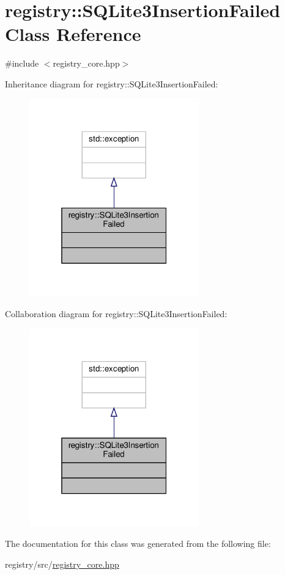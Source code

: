 \hypertarget{classregistry_1_1SQLite3InsertionFailed}{}\section{registry\+:\+:S\+Q\+Lite3\+Insertion\+Failed Class Reference}
\label{classregistry_1_1SQLite3InsertionFailed}


{\ttfamily \#include $<$registry\+\_\+core.\+hpp$>$}



Inheritance diagram for registry\+:\+:S\+Q\+Lite3\+Insertion\+Failed\+:
\nopagebreak
\begin{figure}[H]
\begin{center}
\leavevmode
\includegraphics[width=208pt]{classregistry_1_1SQLite3InsertionFailed__inherit__graph}
\end{center}
\end{figure}


Collaboration diagram for registry\+:\+:S\+Q\+Lite3\+Insertion\+Failed\+:
\nopagebreak
\begin{figure}[H]
\begin{center}
\leavevmode
\includegraphics[width=208pt]{classregistry_1_1SQLite3InsertionFailed__coll__graph}
\end{center}
\end{figure}


The documentation for this class was generated from the following file\+:\begin{DoxyCompactItemize}
\item 
registry/src/\hyperlink{registry__core_8hpp}{registry\+\_\+core.\+hpp}\end{DoxyCompactItemize}

